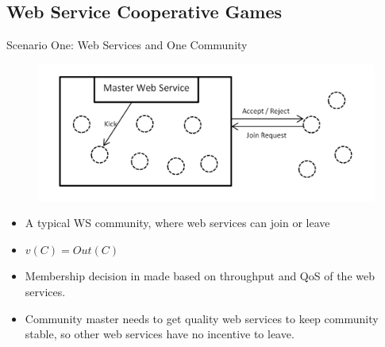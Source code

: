 \documentclass{beamer}
\begin{document}
\subsection{Web Service Cooperative Games}

\begin{frame}{Scenario One: Web Services and One Community}
    \begin{figure}[htbp]
        \centering
        \includegraphics[width=0.8 \columnwidth]{figures/scenario1.png}
    \end{figure}

    \begin{itemize}
        \item A typical WS community, where web services can join or leave
        \item $v(C) = Out(C)$
        \item Membership decision in made based on throughput and QoS of the web services.
        \item Community master needs to get quality web services to keep community stable, so other web services have no incentive to leave.
    \end{itemize}
       	
\end{frame}
\end{document}
